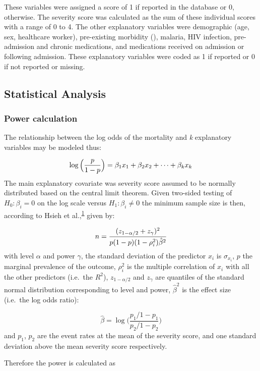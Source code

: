 \documentclass[
  10pt,
]{article}
\begin{document}
These variables were assigned a score of 1 if reported in the database
or 0, otherwise. The severity score was calculated as the sum of these
individual scores with a range of 0 to 4. The other explanatory
variables were demographic (age, sex, healthcare worker), pre-existing
morbidity (), malaria, HIV infection, pre-admission and chronic
medications, and medications received on admission or following
admission. These explanatory variables were coded as 1 if reported or 0
if not reported or missing.

\hypertarget{statistical-analysis}{%
\subsection{Statistical Analysis}\label{statistical-analysis}}

\hypertarget{power-calculation}{%
\subsubsection{Power calculation}\label{power-calculation}}

The relationship between the log odds of the mortality and \emph{k}
explanatory variables may be modeled thus:

\[{\small\log\Big(\frac{p}{1-p}\Big) = \beta_1x_1 + \beta_2x_2 + \cdots + \beta_kx_k}\]
The main explanatory covariate was severity score assumed to be normally
distributed based on the central limit theorem. Given two-sided testing
of \(H_0:\beta_i = 0\) on the log scale versus \(H_1:\beta_i \neq 0\)
the minimum sample size is then, according to Hsieh et
al.,\textsuperscript{\protect\hyperlink{ref-hsieh1998}{1}} given by:

\[\small{n = \frac{(z_{1-\alpha/2} + z_{\gamma})^2}{p(1 - p)(1-\rho^{2}_i)\hat{\beta}^2}}\]
with level \(\alpha\) and power \(\gamma\), the standard deviation of
the predictor \(x_i\) is \(\sigma_{x_i}\), \(p\) the marginal prevalence
of the outcome, \(\rho^{2}_i\) is the multiple correlation of \(x_i\)
with all the other predictors (i.e.~the \(R^2\)), \(z_{1-\alpha/2}\) and
\(z_\gamma\) are quantiles of the standard normal distribution
corresponding to level and power, \(\hat{\beta}^2\) is the effect size
(i.e.~the log odds ratio):

\[\hat{\beta} = \log\Bigg(\frac{p_1/1-p_1}{p_2/1-p_2}\Bigg)\] and
\(p_1\), \(p_2\) are the event rates at the mean of the severity score,
and one standard deviation above the mean severity score respectively.

Therefore the power is calculated as
\end{document}
